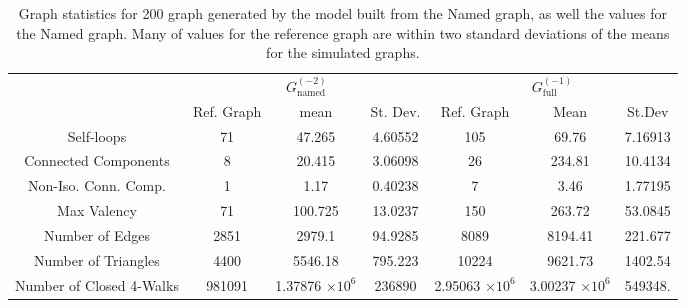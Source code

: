 \documentclass[11]{article}
\newcommand{\namedtwo}{G_{\textrm{named}}^{(-2)}}
\newcommand{\fullone}{G_{\textrm{full}}^{(-1)}}
\theoremstyle{remark}
\theoremstyle{definition}
\begin{document}
\begin{table}[h!]
\begin{tabular}{|c |c | c | c|| c |c | c|} \hline
 & \multicolumn{3}{c||}{$\namedtwo$} & \multicolumn{3}{c|}{$\fullone$} \\ \cline{2-7}
 & Ref. Graph &mean &St. Dev. &  Ref. Graph &Mean &St.Dev \\ \hline
Self-loops & 71 & 47.265 & 4.60552  & 105 & 69.76 & 7.16913 \\ \hline  
Connected Components& 8 & 20.415 & 3.06098 & 26 & 234.81 & 10.4134\\ \hline  
Non-Iso. Conn. Comp. & 1 & 1.17 & 0.40238 & 7 & 3.46 & 1.77195 \\ \hline
Max Valency & 71 & 100.725 & 13.0237 & 150 & 263.72 & 53.0845 \\ \hline
Number of Edges & 2851 & 2979.1 & 94.9285 & 8089 & 8194.41 & 221.677 \\ \hline
Number of Triangles & 4400 & 5546.18 & 795.223  & 10224 & 9621.73 & 1402.54 \\ \hline
Number of Closed 4-Walks & 981091 & 1.37876 $\times 10^6$ & 236890 & 2.95063 $\times 10^6$ & 3.00237 $\times 10^6$ & 549348. \\ \hline
\end{tabular}
\caption{Graph statistics for 200 graph generated by the model built from the Named graph, as well the values for the Named graph. Many of values for the reference graph are within two standard deviations of the means for the simulated graphs. } 
\label{tab:namedstats}
\end{table} 
\end{document}
